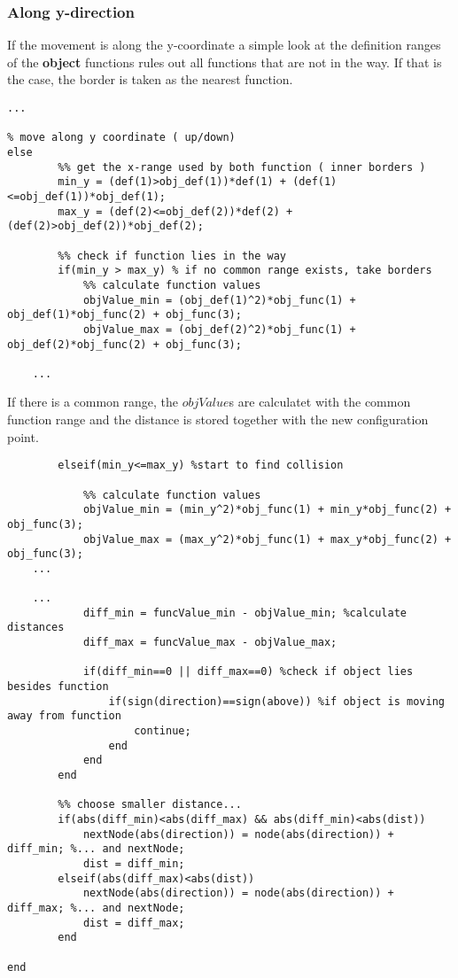 \subsubsection{Along y-direction}
If the movement is along the y-coordinate a simple look at the definition ranges of the \textbf{object} functions rules out all functions that are not in the way.
If that is the case, the border is taken as the nearest function.
\begin{lstlisting}
...

% move along y coordinate ( up/down)
else
        %% get the x-range used by both function ( inner borders )
        min_y = (def(1)>obj_def(1))*def(1) + (def(1)<=obj_def(1))*obj_def(1);
        max_y = (def(2)<=obj_def(2))*def(2) + (def(2)>obj_def(2))*obj_def(2);
        
        %% check if function lies in the way
        if(min_y > max_y) % if no common range exists, take borders
            %% calculate function values
            objValue_min = (obj_def(1)^2)*obj_func(1) + obj_def(1)*obj_func(2) + obj_func(3);
            objValue_max = (obj_def(2)^2)*obj_func(1) + obj_def(2)*obj_func(2) + obj_func(3);
            
    ...
\end{lstlisting}
If there is a common range, the $objValue$s are calculatet with the common function range and the distance is stored together with the new configuration point.
\begin{lstlisting}
        elseif(min_y<=max_y) %start to find collision
            
            %% calculate function values
            objValue_min = (min_y^2)*obj_func(1) + min_y*obj_func(2) + obj_func(3);
            objValue_max = (max_y^2)*obj_func(1) + max_y*obj_func(2) + obj_func(3);
    ...

    ...
            diff_min = funcValue_min - objValue_min; %calculate distances
            diff_max = funcValue_max - objValue_max;
            
            if(diff_min==0 || diff_max==0) %check if object lies besides function
                if(sign(direction)==sign(above)) %if object is moving away from function
                    continue;
                end
            end
        end

        %% choose smaller distance...
        if(abs(diff_min)<abs(diff_max) && abs(diff_min)<abs(dist))
            nextNode(abs(direction)) = node(abs(direction)) + diff_min; %... and nextNode;
            dist = diff_min;
        elseif(abs(diff_max)<abs(dist))
            nextNode(abs(direction)) = node(abs(direction)) + diff_max; %... and nextNode;
            dist = diff_max;
        end
   
end
\end{lstlisting}

